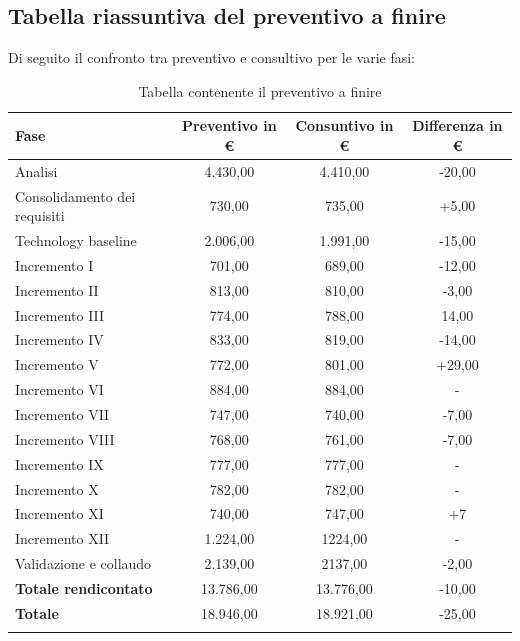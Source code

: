 		
	 	\subsection{Tabella riassuntiva del preventivo a finire}
	 		Di seguito il confronto tra preventivo e consultivo per le varie fasi:
			 \begin{longtable}{|l|c|c|c|}
			 	\hline
			 	\rowcolor{lighter-grayer}
			 	\textbf{Fase} & \textbf{Preventivo in €} & \textbf{Consuntivo in €} & \textbf{Differenza in €}\\
			 	\hline
				\endfirsthead
			 	
			 	\hline
			 	Analisi & 4.430,00 & 4.410,00 & -20,00\\
			 	\hline
			 	\hline
			 	Consolidamento dei requisiti & 730,00 & 735,00 & +5,00\\
			 	\hline
			 	\hline
			 	Technology baseline & 2.006,00 & 1.991,00 & -15,00\\
			 	\hline
			 	\hline
			 	Incremento I & 701,00 & 689,00 & -12,00\\
			 	\hline
			 	\hline
			 	Incremento II & 813,00 & 810,00 & -3,00\\
			 	\hline
			 	\hline
			 	Incremento III & 774,00 & 788,00 & 14,00\\
			 	\hline
			 	\hline
			 	Incremento IV & 833,00 & 819,00 & -14,00\\
			 	\hline
			 	\hline
			 	Incremento V & 772,00 & 801,00 & +29,00\\
			 	\hline
			 	\hline
			 	Incremento VI & 884,00 & 884,00 & -\\
			 	\hline
			 	\hline
			 	Incremento VII & 747,00 & 740,00 & -7,00\\
			 	\hline
			 	\hline
			 	Incremento VIII & 768,00 & 761,00 & -7,00\\
			 	\hline
			 	\hline
			 	Incremento IX & 777,00 & 777,00 & -\\
			 	\hline
			 	\hline
			 	Incremento X & 782,00 & 782,00 & -\\
			 	\hline
			 	\hline
			 	Incremento XI & 740,00 & 747,00 & +7\\
			 	\hline
			 	\hline
			 	Incremento XII & 1.224,00 & 1224,00 & -\\
			 	\hline
		 		\hline
			 	Validazione e collaudo & 2.139,00 & 2137,00 & -2,00\\
			 	\hline
			 	\textbf{Totale rendicontato} & 13.786,00 & 13.776,00 & -10,00\\
			 	\hline
			 	\hline
			 	\textbf{Totale} & 18.946,00 & 18.921,00 & -25,00\\
			 	\hline
			 	\caption{Tabella contenente il preventivo a finire}
			 \end{longtable}
